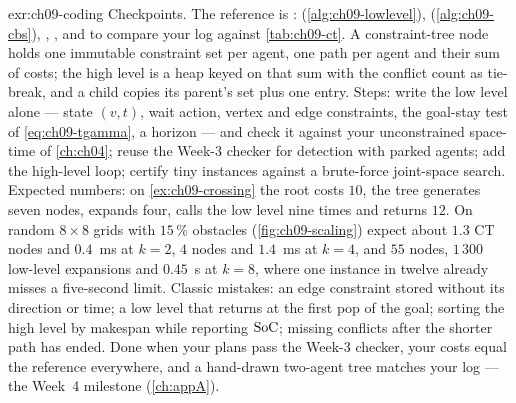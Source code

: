 
\begin{solution}{exr:ch09-coding}
Checkpoints. The reference is : 
(\cref{alg:ch09-lowlevel}),  (\cref{alg:ch09-cbs}), ,
, and  to compare your log against \cref{tab:ch09-ct}. A
constraint-tree node holds one immutable constraint set per agent, one path per agent and
their sum of costs; the high level is a heap keyed on that sum with the conflict count as
tie-break, and a child copies its parent's set plus one entry. Steps: write the low level
alone --- state $(v,t)$, wait action, vertex and edge constraints, the goal-stay test of
\cref{eq:ch09-tgamma}, a horizon --- and check it against your unconstrained space-time
\astar of \cref{ch:ch04}; reuse the Week-3 checker for detection with parked agents; add
the high-level loop; certify tiny instances against a brute-force joint-space search.
Expected numbers: on \cref{ex:ch09-crossing} the root costs $10$, the tree generates seven
nodes, expands four, calls the low level nine times and returns $12$. On random $8\times8$
grids with $15\,\%$ obstacles (\cref{fig:ch09-scaling}) expect about $1.3$ CT nodes and
$0.4$~ms at $k=2$, $4$ nodes and $1.4$~ms at $k=4$, and $55$ nodes, $1\,300$ low-level
expansions and $0.45$~s at $k=8$, where one instance in twelve already misses a
five-second limit. Classic mistakes: an edge constraint stored without its direction or
time; a low level that returns at the first pop of the goal; sorting the high level by
makespan while reporting $\mathrm{SoC}$; missing conflicts after the shorter path has ended.
Done when your plans pass the Week-3 checker, your costs equal the reference everywhere,
and a hand-drawn two-agent tree matches your log --- the Week~4 milestone
(\cref{ch:appA}).
\end{solution}

